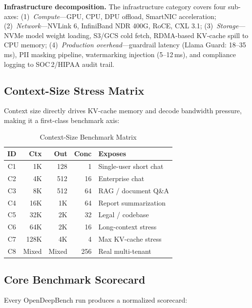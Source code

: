 \documentclass[conference,10pt]{IEEEtran}
\begin{document}
\textbf{Infrastructure decomposition.} The infrastructure category covers four sub-axes: (1)~\emph{Compute}---GPU, CPU, DPU offload, SmartNIC acceleration; (2)~\emph{Network}---NVLink 6, InfiniBand NDR 400G, RoCE, CXL 3.1; (3)~\emph{Storage}---NVMe model weight loading, S3/GCS cold fetch, RDMA-based KV-cache spill to CPU memory; (4)~\emph{Production overhead}---guardrail latency (Llama Guard: 18--35\,ms), PII masking pipeline, watermarking injection (5--12\,ms), and compliance logging to SOC\,2/HIPAA audit trail.

\subsection{Context-Size Stress Matrix}

Context size directly drives KV-cache memory and decode bandwidth pressure, making it a first-class benchmark axis:

\begin{table}[!htbp]
\caption{Context-Size Benchmark Matrix}
\label{tab:context}
\centering\footnotesize
\begin{tabular}{@{}crrrl@{}}
\toprule
\textbf{ID} & \textbf{Ctx} & \textbf{Out} & \textbf{Conc} & \textbf{Exposes} \\
\midrule
C1 & 1K & 128 & 1 & Single-user short chat \\
C2 & 4K & 512 & 16 & Enterprise chat \\
C3 & 8K & 512 & 64 & RAG / document Q\&A \\
C4 & 16K & 1K & 64 & Report summarization \\
C5 & 32K & 2K & 32 & Legal / codebase \\
C6 & 64K & 2K & 16 & Long-context stress \\
C7 & 128K & 4K & 4 & Max KV-cache stress \\
C8 & Mixed & Mixed & 256 & Real multi-tenant \\
\bottomrule
\end{tabular}
\end{table}

\subsection{Core Benchmark Scorecard}

Every OpenDeepBench run produces a normalized scorecard:
\end{document}
